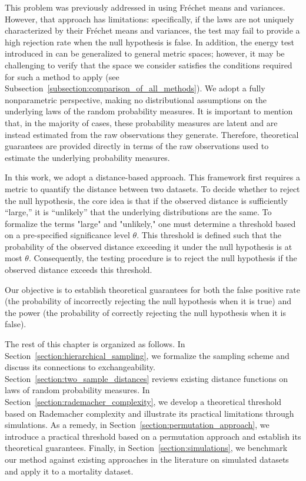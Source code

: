 This problem was previously addressed in \cite{dubey2019frechet} using Fr\'echet means and variances. However, that approach has limitations: specifically, if the laws are not uniquely characterized by their Fr\'echet means and variances, the test may fail to provide a high rejection rate when the null hypothesis is false. In addition, the energy test introduced in \cite{szekely2004testing} can be generalized to general metric spaces; however, it may be challenging to verify that the space we consider satisfies the conditions required for such a method to apply (see Subsection~\ref{subsection:comparison_of_all_methods}). We adopt a fully nonparametric perspective, making no distributional assumptions on the underlying laws of the random probability measures. It is important to mention that, in the majority of cases, these probability measures are latent and are instead estimated from the raw observations they generate. Therefore, theoretical guarantees are provided directly in terms of the raw observations used to estimate the underlying probability measures.

In this work, we adopt a distance-based approach. This framework first requires a metric to quantify the distance between two datasets. To decide whether to reject the null hypothesis, the core idea is that if the observed distance is sufficiently ``large,'' it is ``unlikely'' that the underlying distributions are the same. To formalize the terms "large" and "unlikely," one must determine a threshold based on a pre-specified significance level $\theta$. This threshold is defined such that the probability of the observed distance exceeding it under the null hypothesis is at most $\theta$. Consequently, the testing procedure is to reject the null hypothesis if the observed distance exceeds this threshold. 

Our objective is to establish theoretical guarantees for both the false positive rate (the probability of incorrectly rejecting the null hypothesis when it is true) and the power (the probability of correctly rejecting the null hypothesis when it is false). 

The rest of this chapter is organized as follows. In Section~\ref{section:hierarchical_sampling}, we formalize the sampling scheme and discuss its connections to exchangeability. Section~\ref{section:two_sample_distances} reviews existing distance functions on laws of random probability measures. In Section~\ref{section:rademacher_complexity}, we develop a theoretical threshold based on Rademacher complexity and illustrate its practical limitations through simulations. As a remedy, in Section~\ref{section:permutation_approach}, we introduce a practical threshold based on a permutation approach and establish its theoretical guarantees. Finally, in Section~\ref{section:simulations}, we benchmark our method against existing approaches in the literature on simulated datasets and apply it to a mortality dataset.
